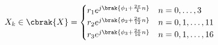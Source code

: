\documentclass{article}
\begin{document}
\begin{equation*}
X_k \in \cbrak{X}=
\begin{cases}
r_1 e^{j\brak{\phi_1+\frac{2\pi}{4}n}}& n=0,\dots,3\\
r_2 e^{j\brak{\phi_2+\frac{2\pi}{12}n}}& n=0,1,\dots,11\\
r_3 e^{j\brak{\phi_3+\frac{2\pi}{16}n}}& n=0,1,\dots,16
\end{cases}
\end{equation*}
\end{document}
